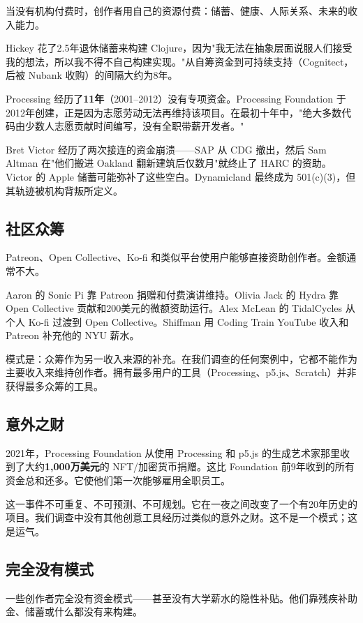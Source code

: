 \documentclass[10pt,letterpaper,twocolumn]{article}
\begin{document}
当没有机构付费时，创作者用自己的资源付费：储蓄、健康、人际关系、未来的收入能力。

Hickey 花了2.5年退休储蓄来构建 Clojure，因为"我无法在抽象层面说服人们接受我的想法，所以我不得不自己构建实现。"从自筹资金到可持续支持（Cognitect，后被 Nubank 收购）的间隔大约为8年。

Processing 经历了\textbf{11年}（2001--2012）没有专项资金。Processing Foundation 于2012年创建，正是因为志愿劳动无法再维持该项目。在最初十年中，"绝大多数代码由少数人志愿贡献时间编写，没有全职带薪开发者。"

Bret Victor 经历了两次接连的资金崩溃——SAP 从 CDG 撤出，然后 Sam Altman 在"他们搬进 Oakland 翻新建筑后仅数月"就终止了 HARC 的资助。Victor 的 Apple 储蓄可能弥补了这些空白。Dynamicland 最终成为 501(c)(3)，但其轨迹被机构背叛所定义。

\subsection{社区众筹}

Patreon、Open Collective、Ko-fi 和类似平台使用户能够直接资助创作者。金额通常不大。

Aaron 的 Sonic Pi 靠 Patreon 捐赠和付费演讲维持。Olivia Jack 的 Hydra 靠 Open Collective 贡献和200美元的微额资助运行。Alex McLean 的 TidalCycles 从个人 Ko-fi 过渡到 Open Collective。Shiffman 用 Coding Train YouTube 收入和 Patreon 补充他的 NYU 薪水。

模式是：众筹作为另一收入来源的补充。在我们调查的任何案例中，它都不能作为主要收入来维持创作者。拥有最多用户的工具（Processing、p5.js、Scratch）并非获得最多众筹的工具。

\subsection{意外之财}

2021年，Processing Foundation 从使用 Processing 和 p5.js 的生成艺术家那里收到了大约\textbf{1,000万美元}的 NFT/加密货币捐赠。这比 Foundation 前9年收到的所有资金总和还多。它使他们第一次能够雇用全职员工。

这一事件不可重复、不可预测、不可规划。它在一夜之间改变了一个有20年历史的项目。我们调查中没有其他创意工具经历过类似的意外之财。这不是一个模式；这是运气。

\subsection{完全没有模式}

一些创作者完全没有资金模式——甚至没有大学薪水的隐性补贴。他们靠残疾补助金、储蓄或什么都没有来构建。
\end{document}
